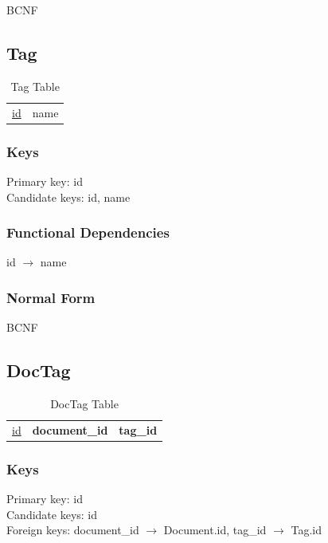 \documentclass[11pt]{article}
\begin{document}
    BCNF
\subsection{Tag}
\label{sec-3-10}


\begin{table}[htb]
\caption{Tag Table} 
\begin{center}
\begin{tabular}{ll}
 \underline{id}  &  name  \\
\end{tabular}
\end{center}
\end{table}
\subsubsection{Keys}
\label{sec-3-10-1}

    
    Primary key: id\\
    Candidate keys: id, name
\subsubsection{Functional Dependencies}
\label{sec-3-10-2}


    id $\rightarrow$ name
\subsubsection{Normal Form}
\label{sec-3-10-3}


    BCNF
\subsection{DocTag}
\label{sec-3-11}


\begin{table}[htb]
\caption{DocTag Table} 
\begin{center}
\begin{tabular}{lll}
 \underline{id}  &  \textbf{document\_id}  &  \textbf{tag\_id}  \\
\end{tabular}
\end{center}
\end{table}

   
\subsubsection{Keys}
\label{sec-3-11-1}

    
    Primary key: id\\
    Candidate keys: id\\
    Foreign keys: document\_id $\rightarrow$ Document.id, tag\_id $\rightarrow$ Tag.id
\end{document}
